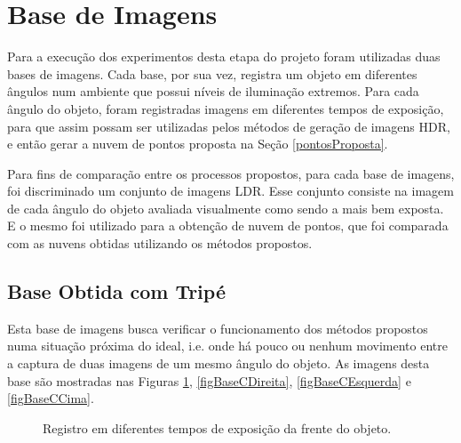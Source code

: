 \section{Base de Imagens} \label{pontosBaseImg}

Para a execução dos experimentos desta etapa do projeto foram utilizadas duas bases de imagens. Cada base, por sua vez, registra um objeto em diferentes ângulos num ambiente que possui níveis de iluminação extremos. Para cada ângulo do objeto, foram registradas imagens em diferentes tempos de exposição, para que assim possam ser utilizadas pelos métodos de geração de imagens HDR, e então gerar a nuvem de pontos proposta na Seção \ref{pontosProposta}.

Para fins de comparação entre os processos propostos, para cada base de imagens, foi discriminado um conjunto de imagens LDR. Esse conjunto consiste na imagem de cada ângulo do objeto avaliada visualmente como sendo a mais bem exposta. E o mesmo foi utilizado para a obtenção de nuvem de pontos, que foi comparada com as nuvens obtidas utilizando os métodos propostos.

\subsection{Base Obtida com Tripé} \label{pontosBControl}
Esta base de imagens busca verificar o funcionamento dos métodos propostos numa situação próxima do ideal, i.e. onde há pouco ou nenhum movimento entre a captura de duas imagens de um mesmo ângulo do objeto. As imagens desta base são mostradas nas Figuras \ref{figBaseCFrente}, \ref{figBaseCDireita}, \ref{figBaseCEsquerda} e \ref{figBaseCCima}.

\begin{figure}[H]
  \centering 
  \quad %
  \quad %
  \quad %
  \caption{Registro em diferentes tempos de exposição da frente do objeto.}
  \label{figBaseCFrente}
\end{figure}

